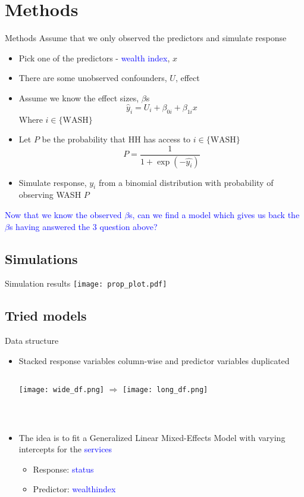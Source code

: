 \documentclass{beamer}
\begin{document}
\section{Methods}
\begin{frame}{Methods}
Assume that we only observed the predictors and simulate response
\begin{itemize}[<+->]
\item Pick one of the predictors - \textcolor{blue}{wealth index}, $x$
\item There are some unobserved confounders, $U$, effect
\item Assume we know the effect sizes, $\beta$s
\pause
\[
\hat{y}_i = U_i + \beta_{0i} + \beta_{1i}x
\]
Where $i\in\{\text{WASH}\}$
\item Let $P$ be the probability that HH has access to $i\in\{\text{WASH}\}$
\[
P = \frac{1}{1 + \exp{(-\hat{y_i})}}
\]
\item Simulate response, $y_i$ from a binomial distribution with probability of observing WASH $P$
\end{itemize}
\pause
\textcolor{blue}{Now that we know the observed $\beta$s, can we find a model which gives us back the $\beta$s having answered the 3 question above?}
\end{frame}

\subsection{Simulations}
\begin{frame}{Simulation results}
\centering
\texttt{[image: prop\_plot.pdf]}
\end{frame}

\subsection{Tried models}
\begin{frame}{Data structure}
\begin{itemize}[<+->]
\item Stacked response variables column-wise and predictor variables duplicated
\begin{columns}[t]
\texttt{[image: wide\_df.png]}
\pause
{}
$\Longrightarrow$
\pause
{}
\texttt{[image: long\_df.png]}
\end{columns}\\
\item The idea is to fit a Generalized Linear Mixed-Effects Model with varying intercepts for the \textcolor{blue}{services}
\begin{itemize}[<+->]
\item Response: \textcolor{blue}{status}
\item Predictor: \textcolor{blue}{wealthindex}
\end{itemize}
\end{itemize}
\end{frame}
\end{document}

